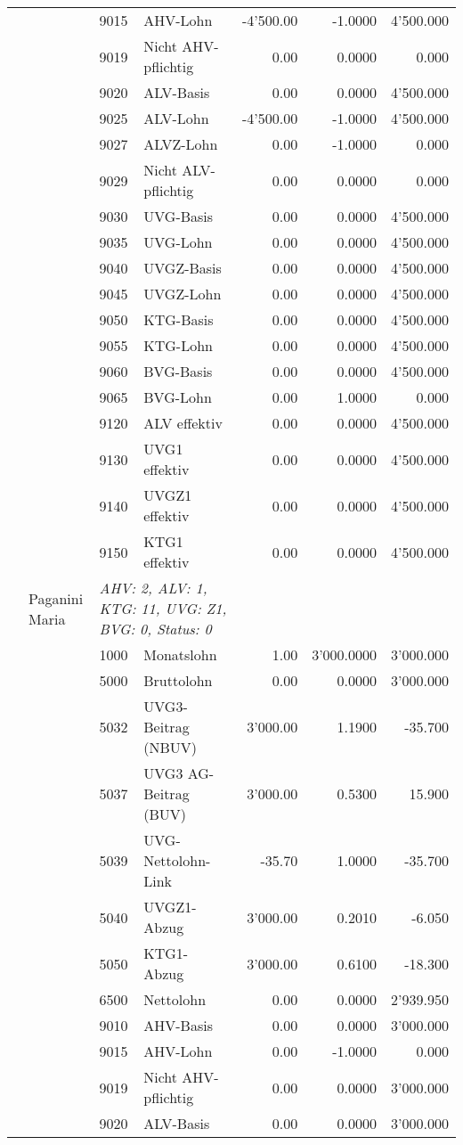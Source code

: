 \documentclass[15pt,a4paper]{article}
\begin{document}
\begin{longtable}{@{\extracolsep{\fill}}l l l l|r|r|r}
&&9015&AHV-Lohn&-4'500.00&-1.0000&4'500.000\\
&&9019&Nicht AHV-pflichtig&0.00&0.0000&0.000\\
&&9020&ALV-Basis&0.00&0.0000&4'500.000\\
&&9025&ALV-Lohn&-4'500.00&-1.0000&4'500.000\\
&&9027&ALVZ-Lohn&0.00&-1.0000&0.000\\
&&9029&Nicht ALV-pflichtig&0.00&0.0000&0.000\\
&&9030&UVG-Basis&0.00&0.0000&4'500.000\\
&&9035&UVG-Lohn&0.00&0.0000&4'500.000\\
&&9040&UVGZ-Basis&0.00&0.0000&4'500.000\\
&&9045&UVGZ-Lohn&0.00&0.0000&4'500.000\\
&&9050&KTG-Basis&0.00&0.0000&4'500.000\\
&&9055&KTG-Lohn&0.00&0.0000&4'500.000\\
&&9060&BVG-Basis&0.00&0.0000&4'500.000\\
&&9065&BVG-Lohn&0.00&1.0000&0.000\\
&&9120&ALV effektiv&0.00&0.0000&4'500.000\\
&&9130&UVG1 effektiv&0.00&0.0000&4'500.000\\
&&9140&UVGZ1 effektiv&0.00&0.0000&4'500.000\\
&&9150&KTG1 effektiv&0.00&0.0000&4'500.000\\
\pagebreak
20&Paganini Maria&\multicolumn{2}{l|}{\small\emph{AHV: 2, ALV: 1, KTG: 11, UVG: Z1, BVG: 0, Status: 0}}&& \\
&&1000&Monatslohn&1.00&3'000.0000&3'000.000\\
&&5000&Bruttolohn&0.00&0.0000&3'000.000\\
&&5032&UVG3-Beitrag (NBUV)&3'000.00&1.1900&-35.700\\
&&5037&UVG3 AG-Beitrag (BUV)&3'000.00&0.5300&15.900\\
&&5039&UVG-Nettolohn-Link&-35.70&1.0000&-35.700\\
&&5040&UVGZ1-Abzug&3'000.00&0.2010&-6.050\\
&&5050&KTG1-Abzug&3'000.00&0.6100&-18.300\\
&&6500&Nettolohn&0.00&0.0000&2'939.950\\
&&9010&AHV-Basis&0.00&0.0000&3'000.000\\
&&9015&AHV-Lohn&0.00&-1.0000&0.000\\
&&9019&Nicht AHV-pflichtig&0.00&0.0000&3'000.000\\
&&9020&ALV-Basis&0.00&0.0000&3'000.000\\

\end{longtable}
\end{document}

